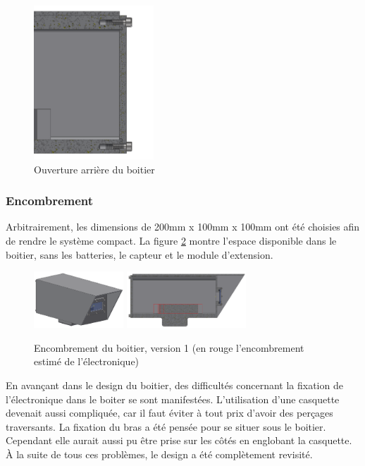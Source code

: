 \begin{figure}[H]
    \centering
    \includegraphics[width=0.4\textwidth]{Images/photos_PGA/Arrièreboitierv3coté.PNG}
    \caption{Ouverture arrière du boitier}
    \label{fig:vuearriereboitier}
\end{figure}

\subsubsection{Encombrement}

Arbitrairement, les dimensions de 200mm x 100mm x 100mm ont été choisies afin de rendre le système
compact. La figure \ref{fig:encombrementv1} montre l'espace disponible dans le boitier, sans 
les batteries, le capteur et le module d'extension.

\begin{figure}[H]
    \centering
    \includegraphics[width=0.3\textwidth]{Images/photos_PGA/boitierV3.PNG}
    \includegraphics[width=0.4\textwidth]{Images/photos_PGA/boitierV3enc.PNG}
    \caption{Encombrement du boitier, version 1 (en rouge l'encombrement estimé de l’électronique)}
    \label{fig:encombrementv1}
\end{figure}

En avançant dans le design du boitier, des difficultés concernant la fixation de l’électronique dans le boiter 
se sont manifestées. L’utilisation d’une casquette devenait aussi compliquée, car il faut éviter à tout prix d'avoir
des perçages traversants. La fixation du bras a été pensée pour se situer
sous le boitier. Cependant elle aurait aussi pu être prise sur les côtés en englobant la casquette. 
À la suite de tous ces problèmes, le design a été complètement revisité.


